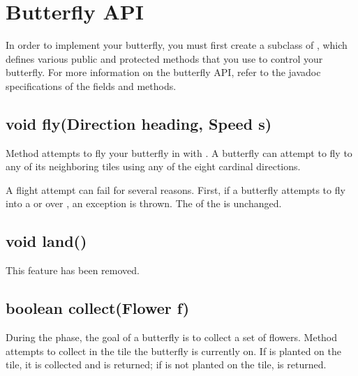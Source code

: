 \documentclass{pset}
\newcommand{\removed}{This feature has been removed.}
\begin{document}
\ifx \BUTTERFLYAPI \undefined \else
\section{Butterfly API}\label{sec:api}
In order to implement your butterfly, you must first create a subclass of
, which defines various public and protected methods
that you use to control your butterfly. For more information on the butterfly
API, refer to the javadoc specifications of the fields and methods.

\ifx \VOIDFLY \undefined \else
\subsection{void fly(Direction heading, Speed s)}
Method  attempts to fly your butterfly in 
with  . A butterfly can attempt to fly to any of its neighboring
tiles using any of the eight cardinal directions.

A flight attempt can fail for several reasons. First, if a butterfly attempts
to fly into a  or over , an
 exception is thrown. The  of
the  is unchanged. 
\fi

\ifx \VOIDFLYSAFE \undefined \else
\fi

\ifx \VOIDLAND \undefined \else
\subsection{void land()}
\removed{}
\fi

\ifx \BOOLEANCOLLECT \undefined \else
\subsection{boolean collect(Flower f)}
During the  phase, the goal of a butterfly is to collect a set of
flowers. Method  attempts to collect  in the tile
the butterfly is currently on. If  is planted on the tile, it is
collected and  is returned; if   is not planted on the tile,
 is returned. 
\fi
\end{document}
